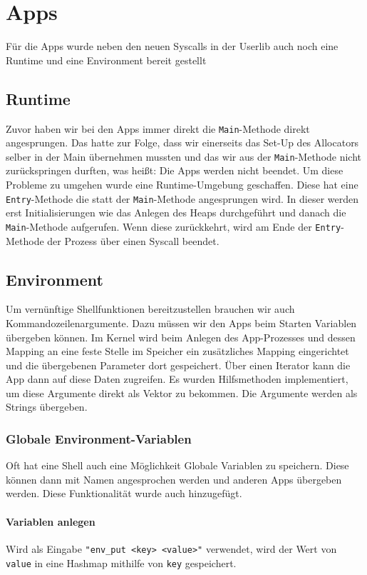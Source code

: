\section{Apps}
Für die Apps wurde neben den neuen Syscalls in der Userlib auch noch eine Runtime und eine Environment bereit gestellt

\subsection{Runtime}
    Zuvor haben wir bei den Apps immer direkt die \verb|Main|-Methode direkt angesprungen. Das hatte zur Folge, dass wir einerseits das Set-Up des Allocators selber in der Main übernehmen mussten und das wir aus der \verb|Main|-Methode nicht zurückspringen durften, was heißt: Die Apps werden nicht beendet. Um diese Probleme zu umgehen wurde eine Runtime-Umgebung geschaffen. Diese hat eine \verb|Entry|-Methode die statt der \verb|Main|-Methode angesprungen wird. In dieser werden erst Initialisierungen wie das Anlegen des Heaps durchgeführt und danach die \verb|Main|-Methode aufgerufen. Wenn diese zurückkehrt, wird am Ende der \verb|Entry|-Methode der Prozess über einen Syscall beendet.

\subsection{Environment}
    Um vernünftige Shellfunktionen bereitzustellen brauchen wir auch Kommandozeilenargumente. Dazu müssen wir den Apps beim Starten Variablen übergeben können. Im Kernel wird beim Anlegen des App-Prozesses und dessen Mapping an eine feste Stelle im Speicher ein zusätzliches Mapping eingerichtet und die übergebenen Parameter dort gespeichert. Über einen Iterator kann die App dann auf diese Daten zugreifen. Es wurden Hilfsmethoden implementiert, um diese Argumente direkt als Vektor zu bekommen. Die Argumente werden als Strings übergeben.
    
    \subsubsection{Globale Environment-Variablen}
        Oft hat eine Shell auch eine Möglichkeit Globale Variablen zu speichern. Diese können dann mit Namen angesprochen werden und anderen Apps übergeben werden. Diese Funktionalität wurde auch hinzugefügt.
        \paragraph{Variablen anlegen}
            Wird als Eingabe \verb|"env_put <key> <value>"| verwendet, wird der Wert von \verb|value| in eine Hashmap mithilfe von \verb|key| gespeichert. 
